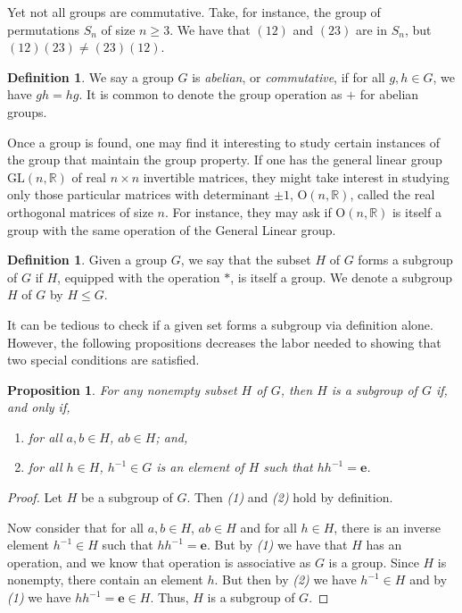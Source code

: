 \documentclass[12pt]{amsart}
\newtheorem{proposition}[theorem]{Proposition}
\theoremstyle{definition}
\newtheorem{definition}[theorem]{Definition}
\theoremstyle{plain}
\def\id{{\mathbf e}}
\def\R{{\mathbb R}}
\begin{document}
Yet not all groups are commutative. Take, for instance, the group of permutations $S_n$ of size $n\geq 3$. We have that $(12)$ and $(23)$ are in $S_n$, but $(12)(23) \neq (23)(12)$.

\begin{definition}
    We say a group $G$ is \emph{abelian}, or \emph{commutative}, if for all $g,h \in G$, we have $gh = hg$. It is common to denote the group operation as $+$ for abelian groups. 
\end{definition}

Once a group is found, one may find it interesting to study certain instances of the group that maintain the group property. If one has the general linear group $\mathrm{GL}(n, \R)$ of real $n \times n$ invertible matrices, they might take interest in studying only those particular matrices with determinant $\pm 1$, $\mathrm{O}(n, \R)$, called the real orthogonal matrices of size $n$. For instance, they may ask if $\mathrm{O}(n, \R)$ is itself a group with the same operation of the General Linear group. 

\begin{definition}
    Given a group $G$, we say that the subset $H$ of $G$ forms a subgroup of $G$ if $H$, equipped with the operation $*$, is itself a group. We denote a subgroup $H$ of $G$ by $H \leq G$.
\end{definition}

It can be tedious to check if a given set forms a subgroup via definition alone. However, the following propositions decreases the labor needed to showing that two special conditions are satisfied.

\begin{proposition}\label{prop:sub}
    For any nonempty subset $H$ of $G$, then $H$ is a subgroup of $G$ if, and only if, 
    \begin{enumerate}
        \item for all $a,b \in H$, $a b \in H$; and,
        \item for all $h \in H$,  $h^{-1} \in G$ is an element of $H$ such that $hh^{-1} = \id$.
    \end{enumerate} 
\end{proposition}

\begin{proof}
    Let $H$ be a subgroup of $G$. Then \emph{(1)} and \emph{(2)} hold by definition.

    Now consider that for all $a,b \in H$, $a b \in H$ and for all $h \in H$, there is an inverse element $h^{-1} \in H$ such that $hh^{-1} = \id$. But by \emph{(1)} we have that $H$ has an operation, and we know that operation is associative as $G$ is a group. Since $H$ is nonempty, there contain an element $h$. But then by \emph{(2)} we have $h^{-1} \in H$ and by \emph{(1)} we have $hh^{-1} = \id \in H$. Thus, $H$ is a subgroup of $G$.
\end{proof}
\end{document}
